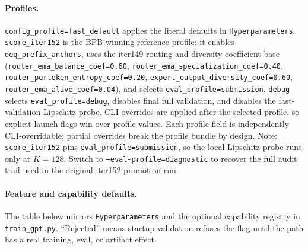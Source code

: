 \documentclass[11pt]{article}
\begin{document}
\paragraph{Profiles.}
\texttt{config\_profile=fast\_default} applies the literal defaults in
\texttt{Hyperparameters}.  \texttt{score\_iter152} is the BPB-winning reference
profile: it enables \texttt{deq\_prefix\_anchors}, uses the iter149 routing and
diversity coefficient base
(\texttt{router\_ema\_balance\_coef=0.60},
\texttt{router\_ema\_specialization\_coef=0.40},
\texttt{router\_pertoken\_entropy\_coef=0.20},
\texttt{expert\_output\_diversity\_coef=0.60},
\texttt{router\_ema\_alive\_coef=0.04}), and selects
\texttt{eval\_profile=submission}.  \texttt{debug} selects
\texttt{eval\_profile=debug}, disables final full validation, and disables the
fast-validation Lipschitz probe.  CLI overrides are applied after the selected
profile, so explicit launch flags win over profile values.  Each profile field
is independently CLI-overridable; partial overrides break the profile bundle
by design.  Note: \texttt{score\_iter152} pins
\texttt{eval\_profile=submission}, so the local Lipschitz probe runs only at
$K=128$.  Switch to \texttt{--eval-profile=diagnostic} to recover the full
audit trail used in the original iter152 promotion run.

\paragraph{Feature and capability defaults.}
The table below mirrors \texttt{Hyperparameters} and the optional capability
registry in \texttt{train\_gpt.py}.  ``Rejected'' means startup validation
refuses the flag until the path has a real training, eval, or artifact effect.
\end{document}

